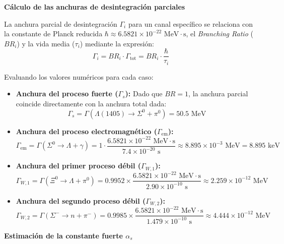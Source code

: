 \begin{problema}
\textbf{Cálculo de las anchuras de desintegración parciales}

La anchura parcial de desintegración $\Gamma_i$ para un canal específico se relaciona con la constante de Planck reducida $\hbar \approx 6.5821 \times 10^{-22} \text{ MeV}\cdot\text{s}$, el \textit{Branching Ratio} ($BR_i$) y la vida media ($\tau_i$) mediante la expresión:
\begin{equation*}
    \Gamma_i = BR_i \cdot \Gamma_{\text{tot}} = BR_i \cdot \frac{\hbar}{\tau_i}
\end{equation*}

Evaluando los valores numéricos para cada caso:
\begin{itemize}
    \item \textbf{Anchura del proceso fuerte ($\Gamma_s$):} Dado que $BR = 1$, la anchura parcial coincide directamente con la anchura total dada:
    \begin{equation*}
        \Gamma_s = \Gamma(\Lambda(1405) \to \Sigma^0 + \pi^0) = 50.5 \text{ MeV}
    \end{equation*}
    \item \textbf{Anchura del proceso electromagnético ($\Gamma_{\text{em}}$):}
    \begin{equation*}
        \Gamma_{\text{em}} = \Gamma(\Sigma^0 \to \Lambda + \gamma) = 1 \cdot \frac{6.5821 \times 10^{-22} \text{ MeV}\cdot\text{s}}{7.4 \times 10^{-20} \text{ s}} \approx 8.895 \times 10^{-3} \text{ MeV} = 8.895 \text{ keV}
    \end{equation*}
    \item \textbf{Anchura del primer proceso débil ($\Gamma_{W,1}$):}
    \begin{equation*}
        \Gamma_{W,1} = \Gamma(\Xi^0 \to \Lambda + \pi^0) = 0.9952 \times \frac{6.5821 \times 10^{-22} \text{ MeV}\cdot\text{s}}{2.90 \times 10^{-10} \text{ s}} \approx 2.259 \times 10^{-12} \text{ MeV}
    \end{equation*}
    \item \textbf{Anchura del segundo proceso débil ($\Gamma_{W,2}$):}
    \begin{equation*}
        \Gamma_{W,2} = \Gamma(\Sigma^- \to n + \pi^-) = 0.9985 \times \frac{6.5821 \times 10^{-22} \text{ MeV}\cdot\text{s}}{1.479 \times 10^{-10} \text{ s}} \approx 4.444 \times 10^{-12} \text{ MeV}
    \end{equation*}
\end{itemize}

\textbf{Estimación de la constante fuerte $\alpha_s$}


\end{problema}
